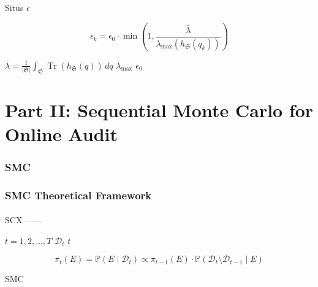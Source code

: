 \documentclass[12pt,a4paper]{article}
\theoremstyle{plain}
\theoremstyle{definition}
\newcommand{\Pbb}{\mathbb{P}}
\newcommand{\D}{\mathcal{D}}
\newcommand{\Situs}{\mathfrak{S}}
\DeclareMathOperator{\Tr}{Tr}
\begin{document}
 Situs  $\epsilon$ 

\begin{equation}\label{eq:adaptive}
    \epsilon_k = \epsilon_0 \cdot \min\!\left(1, \frac{\bar{\lambda}}{\lambda_{\max}(h_{\Situs}(q_k))}\right)
\end{equation}

 $\bar{\lambda} = \frac{1}{|\Situs|} \int_{\Situs} \Tr(h_{\Situs}(q)) \, dq$ 
$\lambda_{\max}$ 
 $\epsilon_0$

\newpage


\part{}
\part*{Part II: Sequential Monte Carlo for Online Audit}

\section{SMC }
\section*{SMC Theoretical Framework}

\subsection{}

 SCX 
\textbf{}——


 $t = 1, 2, \ldots, T$ $\D_t$  $t$ 


\begin{equation}\label{eq:posterior_sequence}
    \pi_t(E) = \Pbb(E \mid \D_t) \propto \pi_{t-1}(E) \cdot \Pbb(\D_t \setminus \D_{t-1} \mid E)
\end{equation}

SMC

\subsection{}
\end{document}
